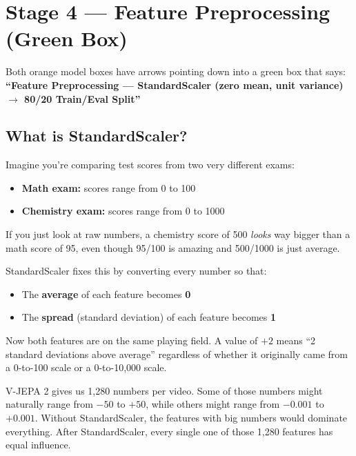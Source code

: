 \documentclass[12pt, a4paper]{article}
\begin{document}
\section{Stage 4 — Feature Preprocessing (Green Box)}

Both orange model boxes have arrows pointing down into a green box that says: \textbf{``Feature Preprocessing — StandardScaler (zero mean, unit variance) $\rightarrow$ 80/20 Train/Eval Split''}

\subsection{What is StandardScaler?}

\begin{analogybox}
Imagine you're comparing test scores from two very different exams:
\begin{itemize}
    \item \textbf{Math exam:} scores range from 0 to 100
    \item \textbf{Chemistry exam:} scores range from 0 to 1000
\end{itemize}
If you just look at raw numbers, a chemistry score of 500 \textit{looks} way bigger than a math score of 95, even though 95/100 is amazing and 500/1000 is just average.

StandardScaler fixes this by converting every number so that:
\begin{itemize}
    \item The \textbf{average} of each feature becomes \textbf{0}
    \item The \textbf{spread} (standard deviation) of each feature becomes \textbf{1}
\end{itemize}
Now both features are on the same playing field. A value of $+2$ means ``2 standard deviations above average'' regardless of whether it originally came from a 0-to-100 scale or a 0-to-10,000 scale.
\end{analogybox}

\begin{examplebox}
V-JEPA 2 gives us 1,280 numbers per video. Some of those numbers might naturally range from $-50$ to $+50$, while others might range from $-0.001$ to $+0.001$. Without StandardScaler, the features with big numbers would dominate everything. After StandardScaler, every single one of those 1,280 features has equal influence.
\end{examplebox}
\end{document}
